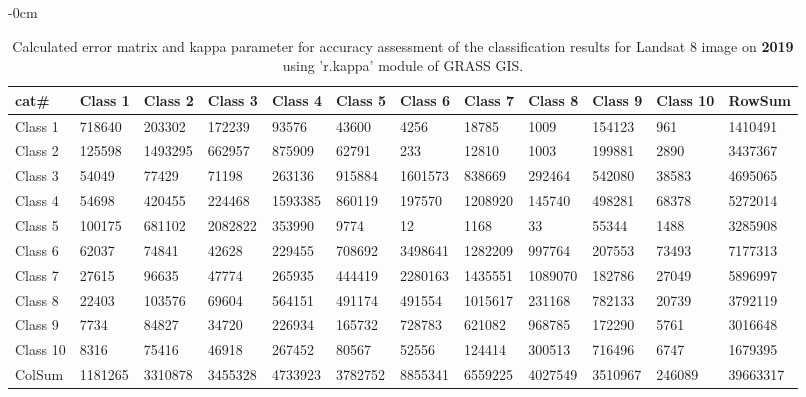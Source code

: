 \documentclass[analytics,article,submit,pdftex,moreauthors]{Definitions/mdpi}
\begin{document}
\begin{table}[H] 
\footnotesize
    \centering
    \begin{adjustwidth}{-\extralength}{0cm}
    \caption{Calculated error matrix and kappa parameter for accuracy assessment of the classification results for Landsat 8 image on \textbf{2019} using 'r.kappa' module of GRASS GIS.\label{tab03}}
 	\begin{tabularx}{\fulllength}{|l|l|l|l|l|l|l|l|l|l|l|l|}
    \toprule
        cat\# & \textbf{Class 1} & \textbf{Class 2} & \textbf{Class 3} & \textbf{Class 4} & \textbf{Class 5} & \textbf{Class 6} & \textbf{Class 7} & \textbf{Class 8} & \textbf{Class 9} & \textbf{Class 10} & \textbf{RowSum} \\ \hline
        Class 1 & \cellcolor{green!10}718640 & 203302 & 172239 & 93576 & 43600 & 4256 & 18785 & 1009 & 154123 & 961 & 1410491 \\ \hline
        Class 2 & 125598 & \cellcolor{green!10}1493295 & 662957 & 875909 & 62791 & 233 & 12810 & 1003 & 199881 & 2890 & 3437367 \\ \hline
        Class 3 & 54049 & 77429 & \cellcolor{green!10}71198 & 263136 & 915884 & 1601573 & 838669 & 292464 & 542080 & 38583 & 4695065 \\ \hline
        Class 4 & 54698 & 420455 & 224468 & \cellcolor{green!10}1593385 & 860119 & 197570 & 1208920 & 145740 & 498281 & 68378 & 5272014 \\ \hline
        Class 5 & 100175 & 681102 & 2082822 & 353990 & \cellcolor{green!10}9774 & 12 & 1168 & 33 & 55344 & 1488 & 3285908 \\ \hline
        Class 6 & 62037 & 74841 & 42628 & 229455 & 708692 & \cellcolor{green!10}3498641 & 1282209 & 997764 & 207553 & 73493 & 7177313 \\ \hline
        Class 7 & 27615 & 96635 & 47774 & 265935 & 444419 & 2280163 & \cellcolor{green!10}1435551 & 1089070 & 182786 & 27049 & 5896997 \\ \hline
        Class 8 & 22403 & 103576 & 69604 & 564151 & 491174 & 491554 & 1015617 & \cellcolor{green!10}231168 & 782133 & 20739 & 3792119 \\ \hline
        Class 9 & 7734 & 84827 & 34720 & 226934 & 165732 & 728783 & 621082 & 968785 & \cellcolor{green!10}172290 & 5761 & 3016648 \\ \hline
        Class 10 & 8316 & 75416 & 46918 & 267452 & 80567 & 52556 & 124414 & 300513 & 716496 & \cellcolor{green!10}6747 & 1679395 \\ \hline
        ColSum & 1181265 & 3310878 & 3455328 & 4733923 & 3782752 & 8855341 & 6559225 & 4027549 & 3510967 & 246089 & \cellcolor{green!10}39663317 \\ \hline
        \bottomrule
    \end{tabularx}
    \end{adjustwidth}
\end{table}
\end{document}
